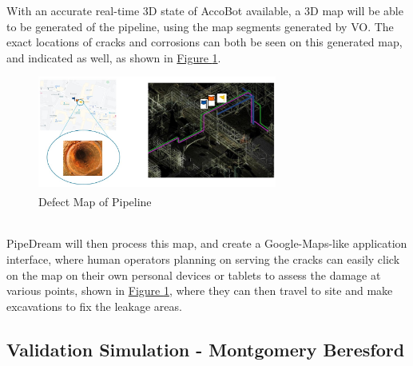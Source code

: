 \documentclass[11pt]{article}		%
\newcommand{\supercite}[1]{\textsuperscript{\cite{#1}}}		%
\newcommand{\figref}[1]{\hyperref[#1]{Figure \ref*{#1}}}    %
\begin{document}
	    With an accurate real-time 3D state of AccoBot available, a 3D map will be able to be generated of the pipeline, using the map segments generated by VO. The exact locations of cracks and corrosions can both be seen on this generated map, and indicated as well, as shown in \figref{defectMap}.
			\begin{figure}[h]
				\centering
				\includegraphics[width=0.7\textwidth]{mapping.jpg}
				\caption{Defect Map of Pipeline\supercite{ELFTransmitter}}
				\label{defectMap}
			\end{figure}
	    \\
        \hspace*{3ex}PipeDream will then process this map, and create a Google-Maps-like application interface, where human operators planning on serving the cracks can easily click on the map on their own personal devices or tablets to assess the damage at various points, shown in \figref{defectMap}, where they can then travel to site and make excavations to fix the leakage areas. 
	
	  \subsection[Validation Simulation]{Validation Simulation - Montgomery Beresford} \label{simulation}
	        
\end{document}
